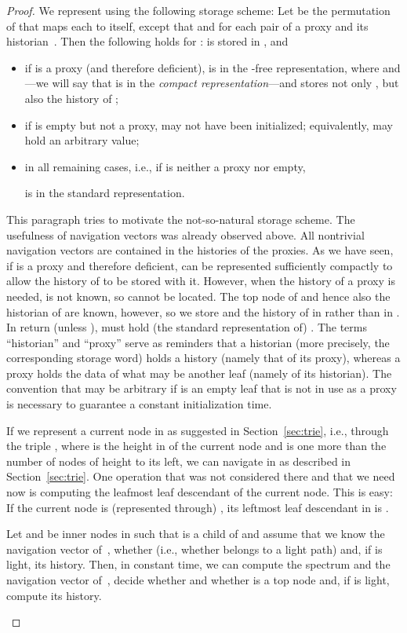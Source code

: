 \documentclass[envcountsame,envcountsect,undated,nolinenumbers]{lnthi}
\begin{document}
\begin{proof}
We represent  using the following
storage scheme:
Let  be the permutation of 
that maps each  to itself,
except that  and  for each
pair of a proxy  and its historian~.
Then the following holds for :
 is stored in , and
\begin{itemize}
\item
if  is a proxy (and therefore deficient),
 is in the -free representation,
where  and
---we
will say that
 is in the
\emph{compact representation}---and
 stores not only , but also the history of ;
\item
if  is empty but not a proxy,
 may not have been initialized;
equivalently,  may hold an arbitrary value;
\item
in all remaining cases, i.e., if  is neither a
proxy nor empty,

is in the standard representation.
\end{itemize}

\noindent
This paragraph tries to motivate the
not-so-natural storage scheme.
The usefulness of navigation vectors was
already observed above.
All nontrivial navigation vectors
are contained in the histories of the proxies.
As we have seen, if  is a proxy and
therefore deficient,  can
be represented sufficiently compactly to allow
the history of  to be stored with it.
However, when the history of a proxy 
is needed,  is not known, so  cannot
be located.
The top node of  and hence also the
historian  of  are known, however, so
we store  and the history of 
in  rather than in .
In return (unless ),  must hold
(the standard representation of) .
The terms ``historian'' and ``proxy'' serve as reminders
that a historian (more precisely, the
corresponding storage word) holds a history
(namely that of its proxy), whereas a proxy
holds the data of what may be
another leaf (namely of its historian).
The convention that  may be arbitrary if
 is an empty leaf that is not in use as a proxy
is necessary to guarantee
a constant initialization time.

If we represent a current node in  as suggested
in Section~\ref{sec:trie}, i.e., through
the triple , where  is the height
in  of the current node and  is one more
than the number of nodes of height  to its left,
we can navigate in  as described
in Section~\ref{sec:trie}.
One operation that was not considered there and that
we need now is computing the leafmost leaf
descendant of the current node.
This is easy:
If the current node is (represented through)
, its leftmost leaf descendant in  is
.

\begin{proposition}
\label{prop:navigation}Let  and  be inner nodes in  such that
 is a child of  and assume that we know
the navigation vector of~, whether 
(i.e., whether  belongs to a light path)
and, if  is light, its history.
Then, in constant time, we can compute the spectrum
and the navigation vector of~,
decide whether 
and whether  is a top node and, if
 is light, compute its history.
\end{proposition}


\end{proof}
\end{document}
